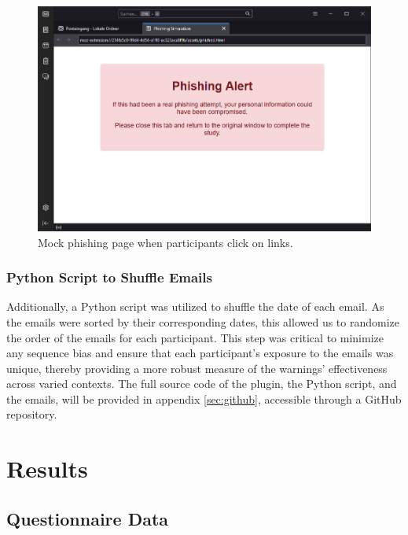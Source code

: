 \documentclass[
  a4paper,  %
  twoside,  %
  bibliography=totoc,
  headsepline,
  cleardoublepage=empty,
  parskip=half,
  draft=false
]{scrbook}
\begin{document}
\begin{figure} [ht]
    \centering
    \includegraphics[width=1\linewidth]{figures/mockpage.png}
    \caption{Mock phishing page when participants click on links.}
    \label{fig:mock}
\end{figure}


\subsection{Python Script to Shuffle Emails}
Additionally, a Python script was utilized to shuffle the date of each email. As the emails were sorted by their corresponding dates, this allowed us to randomize the order of the emails for each participant. This step was critical to minimize any sequence bias and ensure that each participant's exposure to the emails was unique, thereby providing a more robust measure of the warnings' effectiveness across varied contexts. The full source code of the plugin, the Python script, and the emails, will be provided in appendix \ref{sec:github}, accessible through a GitHub repository.

\chapter{Results}
\label{results}

\section{Questionnaire Data}
\end{document}
